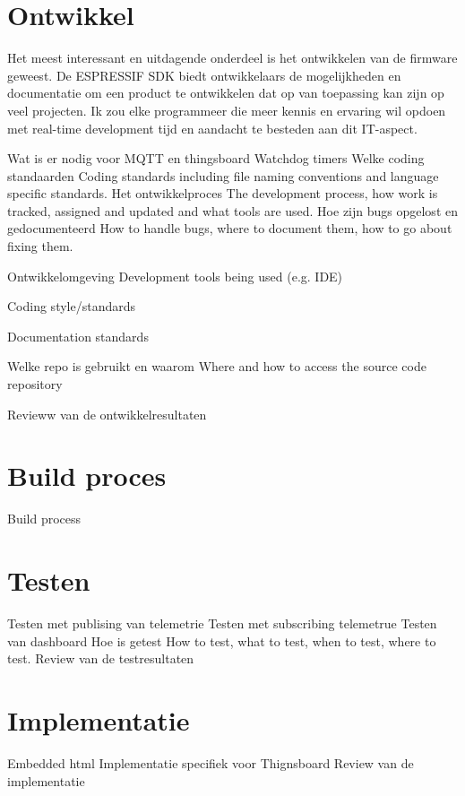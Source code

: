 		
		\section{Ontwikkel}
		Het meest interessant en uitdagende onderdeel is het ontwikkelen van de firmware geweest. De ESPRESSIF SDK biedt ontwikkelaars de mogelijkheden en documentatie om een product te ontwikkelen dat op van toepassing kan zijn op veel projecten. Ik zou elke programmeer die meer kennis en ervaring wil opdoen met real-time development tijd en aandacht te besteden aan dit IT-aspect.
		
		Wat is er nodig voor MQTT en thingsboard
		Watchdog timers
		Welke coding standaarden
		Coding standards including file naming conventions and language specific standards.
		Het ontwikkelproces
		The development process, how work is tracked, assigned and updated and what tools are used.
		Hoe zijn bugs opgelost en gedocumenteerd
		How to handle bugs, where to document them, how to go about fixing them.
		
		Ontwikkelomgeving
		Development tools being used (e.g. IDE)
		
		Coding style/standards
		
		Documentation standards
		
		Welke repo is gebruikt en waarom
		Where and how to access the source code repository
		
		Revieww van de ontwikkelresultaten
		
		
		
		
		
		\section{Build proces}
		Build process
		
		
		\section{Testen}
		
		Testen met publising van telemetrie
		Testen met subscribing telemetrue
		Testen van dashboard
		Hoe is getest
		How to test, what to test, when to test, where to test.
		Review van de testresultaten
		
		\section{Implementatie}
		Embedded html
		Implementatie specifiek voor Thignsboard
		Review van de implementatie
		
